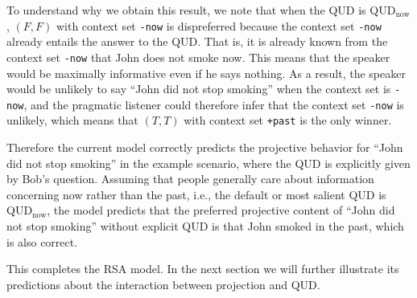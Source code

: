 To understand why we obtain this result, we note that 
 when the QUD is QUD$_\textrm{now}$, $(F, F)$ with context set
 \verb=-now= is dispreferred because the context set \verb=-now= already entails 
 the answer to the QUD. 
That is, it is already known from the context set \verb=-now= that John does not 
 smoke now.
This means that the speaker would be maximally informative even if he says nothing.
As a result, the speaker would be unlikely to say ``John did not stop smoking'' 
 when the context set is \verb=-now=, and the pragmatic listener could therefore
 infer that the context set \verb=-now= is unlikely, which means that 
 $(T, T)$ with context set \verb=+past= is the only winner.


Therefore the current model correctly predicts the projective behavior for 
 ``John did not stop smoking'' in the example scenario, where the QUD is explicitly
 given by Bob's question. 
Assuming that people generally care about information concerning now rather than 
 the past, i.e., the default or most salient QUD is QUD$_\text{now}$,
the model predicts that the preferred projective content of 
 ``John did not stop smoking'' without explicit QUD is that 
 John smoked in the past, which is also correct.

This completes the RSA model. In the next section we will further illustrate its predictions about the interaction between projection and QUD. 

